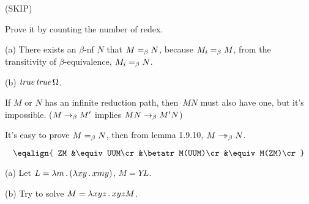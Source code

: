  (SKIP)

 Prove it by counting the number of redex.

 (a) There exists an $\beta$-nf $N$ that $M=_\beta N$, because $M_i=_\beta M$, from
the transitivity of $\beta$-equivalence, $M_i=_\beta N$. \par\noindent
(b) $\hbox{\it true}\,\hbox{\it true}\,\Omega$.

 If $M$ or $N$ has an infinite reduction path, then~$MN$ must also have one, but it's impossible.
($M\to_\beta M'$ implies $MN\to_\beta M'N$)

 It's easy to prove $M=_\beta N$, then from lemma 1.9.10, $M\to\!\!\!\!\!\to_\beta N$.

 $$
\eqalign{
ZM
&\equiv UUM\cr
&\betatr M(UUM)\cr
&\equiv M(ZM)\cr
}$$

 (a) Let $L = \lambda m\,.\, (\lambda xy\,.\, xmy)$, $M = YL$.\par\noindent
(b) Try to solve $M = \lambda xyz \,.\, xyzM$.

\bye
